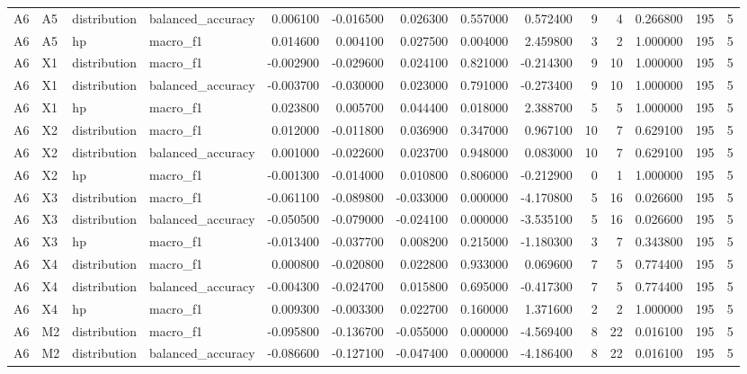 \begin{table}
\begin{tabular}{llllrrrrrrrrrr}
A6 & A5 & distribution & balanced\_accuracy & 0.006100 & -0.016500 & 0.026300 & 0.557000 & 0.572400 & 9 & 4 & 0.266800 & 195 & 5 \\
A6 & A5 & hp & macro\_f1 & 0.014600 & 0.004100 & 0.027500 & 0.004000 & 2.459800 & 3 & 2 & 1.000000 & 195 & 5 \\
A6 & X1 & distribution & macro\_f1 & -0.002900 & -0.029600 & 0.024100 & 0.821000 & -0.214300 & 9 & 10 & 1.000000 & 195 & 5 \\
A6 & X1 & distribution & balanced\_accuracy & -0.003700 & -0.030000 & 0.023000 & 0.791000 & -0.273400 & 9 & 10 & 1.000000 & 195 & 5 \\
A6 & X1 & hp & macro\_f1 & 0.023800 & 0.005700 & 0.044400 & 0.018000 & 2.388700 & 5 & 5 & 1.000000 & 195 & 5 \\
A6 & X2 & distribution & macro\_f1 & 0.012000 & -0.011800 & 0.036900 & 0.347000 & 0.967100 & 10 & 7 & 0.629100 & 195 & 5 \\
A6 & X2 & distribution & balanced\_accuracy & 0.001000 & -0.022600 & 0.023700 & 0.948000 & 0.083000 & 10 & 7 & 0.629100 & 195 & 5 \\
A6 & X2 & hp & macro\_f1 & -0.001300 & -0.014000 & 0.010800 & 0.806000 & -0.212900 & 0 & 1 & 1.000000 & 195 & 5 \\
A6 & X3 & distribution & macro\_f1 & -0.061100 & -0.089800 & -0.033000 & 0.000000 & -4.170800 & 5 & 16 & 0.026600 & 195 & 5 \\
A6 & X3 & distribution & balanced\_accuracy & -0.050500 & -0.079000 & -0.024100 & 0.000000 & -3.535100 & 5 & 16 & 0.026600 & 195 & 5 \\
A6 & X3 & hp & macro\_f1 & -0.013400 & -0.037700 & 0.008200 & 0.215000 & -1.180300 & 3 & 7 & 0.343800 & 195 & 5 \\
A6 & X4 & distribution & macro\_f1 & 0.000800 & -0.020800 & 0.022800 & 0.933000 & 0.069600 & 7 & 5 & 0.774400 & 195 & 5 \\
A6 & X4 & distribution & balanced\_accuracy & -0.004300 & -0.024700 & 0.015800 & 0.695000 & -0.417300 & 7 & 5 & 0.774400 & 195 & 5 \\
A6 & X4 & hp & macro\_f1 & 0.009300 & -0.003300 & 0.022700 & 0.160000 & 1.371600 & 2 & 2 & 1.000000 & 195 & 5 \\
A6 & M2 & distribution & macro\_f1 & -0.095800 & -0.136700 & -0.055000 & 0.000000 & -4.569400 & 8 & 22 & 0.016100 & 195 & 5 \\
A6 & M2 & distribution & balanced\_accuracy & -0.086600 & -0.127100 & -0.047400 & 0.000000 & -4.186400 & 8 & 22 & 0.016100 & 195 & 5 \\

\end{tabular}
\end{table}
